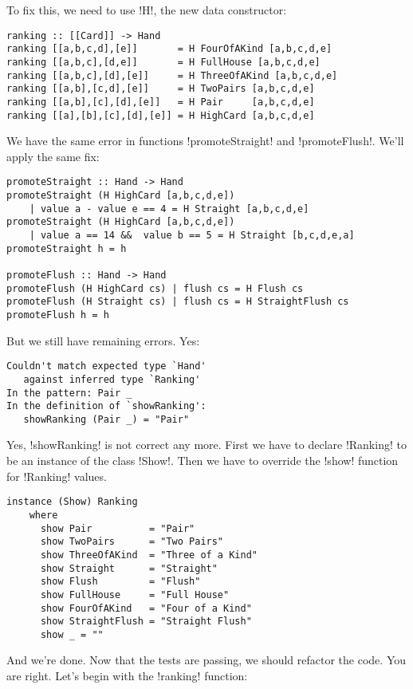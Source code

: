 \lhA \error To fix this, we need to use \il!H!, the new data constructor:
\begin{lstlisting}[frame=single]
ranking :: [[Card]] -> Hand
ranking [[a,b,c,d],[e]]       = H FourOfAKind [a,b,c,d,e]
ranking [[a,b,c],[d,e]]       = H FullHouse [a,b,c,d,e]
ranking [[a,b,c],[d],[e]]     = H ThreeOfAKind [a,b,c,d,e]
ranking [[a,b],[c,d],[e]]     = H TwoPairs [a,b,c,d,e]
ranking [[a,b],[c],[d],[e]]   = H Pair     [a,b,c,d,e]
ranking [[a],[b],[c],[d],[e]] = H HighCard [a,b,c,d,e] 
\end{lstlisting}
\lhN We have the same error in functions \il!promoteStraight! and \il!promoteFlush!.
\lhA \error We'll apply the same fix:
\begin{lstlisting}[frame=single]
promoteStraight :: Hand -> Hand
promoteStraight (H HighCard [a,b,c,d,e]) 
    | value a - value e == 4 = H Straight [a,b,c,d,e]
promoteStraight (H HighCard [a,b,c,d,e]) 
    | value a == 14 &&  value b == 5 = H Straight [b,c,d,e,a]
promoteStraight h = h

promoteFlush :: Hand -> Hand
promoteFlush (H HighCard cs) | flush cs = H Flush cs
promoteFlush (H Straight cs) | flush cs = H StraightFlush cs
promoteFlush h = h
\end{lstlisting}
\error But we still have remaining errors.
\lhN Yes: \\
\begin{small}
\begin{verbatim}
Couldn't match expected type `Hand' 
   against inferred type `Ranking'
In the pattern: Pair _
In the definition of `showRanking': 
   showRanking (Pair _) = "Pair"
\end{verbatim}
\end{small}
\lhA Yes, \il!showRanking! is not correct any more. First we have to declare \il!Ranking! to be an instance of the class \il!Show!. Then we have to override the \il!show! function for \il!Ranking! values.
\begin{lstlisting}[frame=single]
instance (Show) Ranking
    where
      show Pair          = "Pair" 
      show TwoPairs      = "Two Pairs" 
      show ThreeOfAKind  = "Three of a Kind" 
      show Straight      = "Straight" 
      show Flush         = "Flush" 
      show FullHouse     = "Full House" 
      show FourOfAKind   = "Four of a Kind"
      show StraightFlush = "Straight Flush"
      show _ = ""
\end{lstlisting}
\success And we're done.
\lhN Now that the tests are passing, we should refactor the code.
\lhA You are right. Let's begin with the \il!ranking! function:
